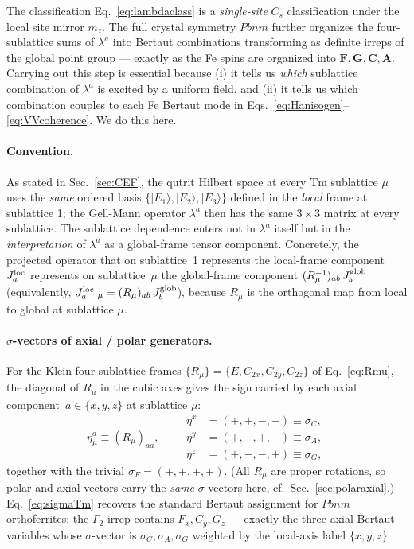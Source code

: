 \documentclass[reprint,amsmath,amssymb,aps,prb,longbibliography]{revtex4-2}
\newcommand{\bfF}{\mathbf{F}}
\newcommand{\bfG}{\mathbf{G}}
\newcommand{\bfA}{\mathbf{A}}
\newcommand{\bfC}{\mathbf{C}}
\begin{document}
The classification Eq.~\eqref{eq:lambdaclass} is a \emph{single-site}
$C_s$ classification under the local site mirror $m_z$. The full
crystal symmetry $Pbnm$ further organizes the four-sublattice sums of
$\lambda^a$ into Bertaut combinations transforming as definite irreps
of the global point group --- exactly as the Fe spins are organized
into $\bfF,\bfG,\bfC,\bfA$. Carrying out this step is essential
because (i) it tells us \emph{which} sublattice combination of
$\lambda^a$ is excited by a uniform field, and (ii) it tells us which
combination couples to each Fe Bertaut mode in
Eqs.~\eqref{eq:Hanisogen}--\eqref{eq:VVcoherence}. We do this here.

\paragraph{Convention.} As stated in Sec.~\ref{sec:CEF}, the
qutrit Hilbert space at every Tm sublattice $\mu$ uses the \emph{same}
ordered basis $\{|E_1\rangle,|E_2\rangle,|E_3\rangle\}$ defined in the
\emph{local} frame at sublattice 1; the Gell-Mann operator $\lambda^a$
then has the same $3\times 3$ matrix at every sublattice. The
sublattice dependence enters not in $\lambda^a$ itself but in the
\emph{interpretation} of $\lambda^a$ as a global-frame tensor
component. Concretely, the projected operator that on sublattice~1
represents the local-frame component $J_a^{\rm loc}$ represents on
sublattice~$\mu$ the global-frame component $(R_\mu^{-1})_{ab}\,J_b^{\rm glob}$
(equivalently, $J_a^{\rm loc}|_\mu = (R_\mu)_{ab}\,J_b^{\rm glob}$),
because $R_\mu$ is the orthogonal map from local to global at sublattice $\mu$.

\paragraph{$\sigma$-vectors of axial / polar generators.} For the
Klein-four sublattice frames $\{R_\mu\}=\{E,C_{2x},C_{2y},C_{2z}\}$
of Eq.~\eqref{eq:Rmu}, the diagonal of $R_\mu$ in the cubic axes gives
the sign carried by each axial component~$a\in\{x,y,z\}$ at sublattice
$\mu$:
\begin{equation}
\eta^a_\mu \equiv (R_\mu)_{aa},\qquad
\begin{aligned}
\eta^x &= (+,+,-,-)\equiv\sigma_C,\\
\eta^y &= (+,-,+,-)\equiv\sigma_A,\\
\eta^z &= (+,-,-,+)\equiv\sigma_G,
\end{aligned}
\label{eq:sigmaTm}
\end{equation}
together with the trivial $\sigma_F=(+,+,+,+)$. (All $R_\mu$ are
proper rotations, so polar and axial vectors carry the \emph{same}
$\sigma$-vectors here, cf.\ Sec.~\ref{sec:polaraxial}.) Eq.~\eqref{eq:sigmaTm}
recovers the standard Bertaut assignment for $Pbnm$ orthoferrites:
the $\Gamma_2$ irrep contains $F_x, C_y, G_z$ --- exactly the three
axial Bertaut variables whose $\sigma$-vector is $\sigma_C, \sigma_A, \sigma_G$
weighted by the local-axis label $\{x,y,z\}$.
\end{document}
